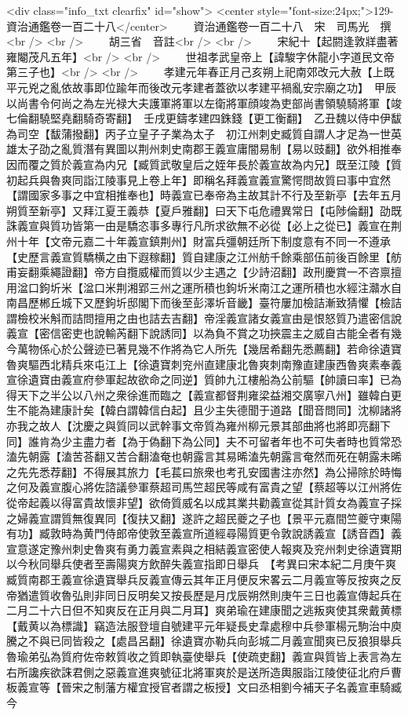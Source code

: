 <div class="info_txt clearfix" id="show">
<center style="font-size:24px;">129-資治通鑑卷一百二十八</center>
  　　資治通鑑卷一百二十八　宋　司馬光　撰<br />
<br />
　　胡三省　音註<br />
<br />
　　宋紀十【起閼逢敦牂盡著雍閹茂凡五年】<br />
<br />
　　世祖孝武皇帝上【諱駿字休龍小字道民文帝第三子也】<br />
<br />
　　孝建元年春正月己亥朔上祀南郊改元大赦【上既平元兇之亂依故事即位踰年而後改元孝建者蓋欲以孝建平禍亂安宗廟之功】　甲辰以尚書令何尚之為左光禄大夫護軍將軍以左衛將軍顔竣為吏部尚書領驍騎將軍【竣七倫翻驍堅堯翻騎奇寄翻】　壬戌更鑄孝建四銖錢【更工衡翻】　乙丑魏以侍中伊馛為司空【馛蒲撥翻】丙子立皇子子業為太子　初江州刺史臧質自謂人才足為一世英雄太子劭之亂質潛有異圖以荆州刺史南郡王義宣庸闇易制【易以豉翻】欲外相推奉因而覆之質於義宣為内兄【臧質武敬皇后之姪年長於義宣故為内兄】既至江陵【質初起兵與魯爽同詣江陵事見上卷上年】即稱名拜義宣義宣驚愕問故質曰事中宜然【謂國家多事之中宜相推奉也】時義宣已奉帝為主故其計不行及至新亭【去年五月朔質至新亭】又拜江夏王義恭【夏戶雅翻】曰天下屯危禮異常日【屯陟倫翻】劭既誅義宣與質功皆第一由是驕恣事多專行凡所求欲無不必從【必上之從已】義宣在荆州十年【文帝元嘉二十年義宣鎮荆州】財富兵彊朝廷所下制度意有不同一不遵承【史歷言義宣質驕横之由下遐稼翻】質自建康之江州舫千餘乘部伍前後百餘里【舫甫妄翻乘繩證翻】帝方自攬威權而質以少主遇之【少詩沼翻】政刑慶賞一不咨禀擅用湓口鉤圻米【湓口米荆湘郢三州之運所積也鉤圻米南江之運所積也水經注灨水自南昌歷郴丘城下又歷鉤圻邸閣下而後至彭澤圻音畿】臺符屢加檢詰漸致猜懼【檢詰謂檢校米斛而詰問擅用之由也詰去吉翻】帝淫義宣諸女義宣由是恨怒質乃遣密信說義宣【密信密吏也說輸芮翻下說誘同】以為負不賞之功挾震主之威自古能全者有幾今萬物係心於公聲迹已著見幾不作將為它人所先【幾居希翻先悉薦翻】若命徐遺寶魯爽驅西北精兵來屯江上【徐遺寶刺兖州直建康北魯爽刺南豫直建康西魯爽素奉義宣徐遺寶由義宣府參軍起故欲命之同逆】質帥九江樓船為公前驅【帥讀曰率】已為得天下之半公以八州之衆徐進而臨之【義宣都督荆雍梁益湘交廣寧八州】雖韓白更生不能為建康計矣【韓白謂韓信白起】且少主失德聞于道路【聞音問同】沈柳諸將亦我之故人【沈慶之與質同以武幹事文帝質為雍州柳元景其部曲將也將即亮翻下同】誰肯為少主盡力者【為于偽翻下為公同】夫不可留者年也不可失者時也質常恐溘先朝露【溘苦荅翻又苦合翻溘奄也朝露言其易晞溘先朝露言奄然而死在朝露未晞之先先悉荐翻】不得展其旅力【毛萇曰旅衆也考孔安國書注亦然】為公掃除於時悔之何及義宣腹心將佐諮議參軍蔡超司馬竺超民等咸有富貴之望【蔡超等以江州將佐從帝起義以得富貴故懷非望】欲倚質威名以成其業共勸義宣從其計質女為義宣子採之婦義宣謂質無復異同【復扶又翻】遂許之超民夔之子也【景平元嘉間竺夔守東陽有功】臧敦時為黄門侍郎帝使敦至義宣所道經尋陽質更令敦說誘義宣【誘音酉】義宣意遂定豫州刺史魯爽有勇力義宣素與之相結義宣密使人報爽及兖州刺史徐遺寶期以今秋同舉兵使者至壽陽爽方飲醉失義宣指即日舉兵　【考異曰宋本紀二月庚午爽臧質南郡王義宣徐遺寶舉兵反義宣傳云其年正月便反宋畧云二月義宣等反按爽之反帝猶遣質收魯弘則非同日反明矣又按長歷是月戊辰朔然則庚午三日也義宣傳起兵在二月二十六日但不知爽反在正月與二月耳】爽弟瑜在建康聞之逃叛爽使其衆戴黄標【戴黄以為標識】竊造法服登壇自號建平元年疑長史韋處穆中兵參軍楊元駒治中庾騰之不與已同皆殺之【處昌呂翻】徐遺寶亦勒兵向彭城二月義宣聞爽已反狼狽舉兵魯瑜弟弘為質府佐帝敕質收之質即執臺使舉兵【使疏吏翻】義宣與質皆上表言為左右所讒疾欲誅君側之惡義宣進爽號征北將軍爽於是送所造輿服詣江陵使征北府戶曹板義宣等【晉宋之制藩方權宜授官者謂之板授】文曰丞相劉今補天子名義宣車騎臧今